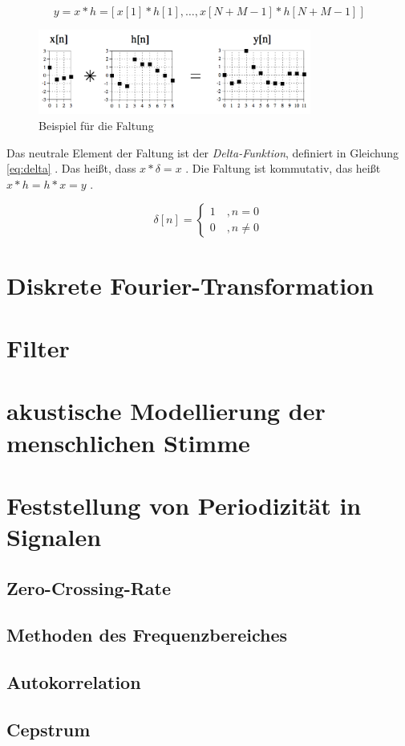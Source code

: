 \begin{equation}
y = x * h = \big[ \: x[1] * h[1] , \ldots , x[N+M-1] * h[N+M-1] \: \big]
\label{eq:convolution}
\end{equation}

\begin{figure}[h]
	\centering
	\includegraphics[width=0.8\textwidth]{bilder/convolutionExample.png}
	\caption{Beispiel für die Faltung}
	\label{img:convolutionExample}
\end{figure}

Das neutrale Element der Faltung ist der \emph{Delta-Funktion}, definiert in Gleichung \ref{eq:delta} . Das heißt, dass $x * \delta = x$ . Die Faltung ist kommutativ, das heißt $ x * h = h * x = y$ . \cite[S. 107, 113 ]{dspGuide}

\begin{equation}
\delta[n] = 
\begin{cases}
1 \quad , n = 0\\
0 \quad ,  n \neq 0
\label{eq:delta}
\end{cases}
\end{equation}


\section{Diskrete Fourier-Transformation}

\section{Filter}
\section{akustische Modellierung der menschlichen Stimme}
\section{Feststellung von Periodizität in Signalen}
\subsection{Zero-Crossing-Rate}
\subsection{Methoden des Frequenzbereiches}
\subsection{Autokorrelation}
\subsection{Cepstrum}
